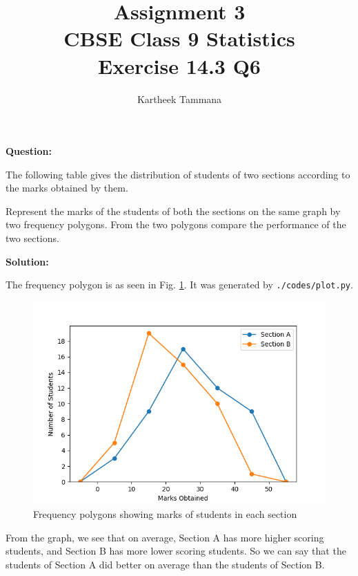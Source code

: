 \documentclass[journal, 12pt, twocolumn]{IEEEtran}
\title{Assignment 3 \\ CBSE Class 9 Statistics \\ Exercise 14.3 Q6}
\author{Kartheek Tammana}
\begin{document}
\maketitle

\textbf{Question:}

The following table gives the distribution of students of two sections according to the marks
obtained by them.

\begin{table}[!htb]
    
    \caption{}
    \label{table:data}
\end{table}

Represent the marks of the students of both the sections on the same graph by two frequency
polygons. From the two polygons compare the performance of the two sections.

\textbf{Solution:}

The frequency polygon is as seen in Fig. \ref{fig:graph}. It was generated by \texttt{./codes/plot.py}.

\begin{figure}[!ht]
    \centering
    \includegraphics[width=\columnwidth]{./figs/freq_poly.png}
    \caption{Frequency polygons showing marks of students in each section}
    \label{fig:graph}
\end{figure}

From the graph, we see that on average, Section A has more higher scoring students, and Section B
has more lower scoring students. So we can say that the students of Section A did better on average
than the students of Section B.
\end{document}
